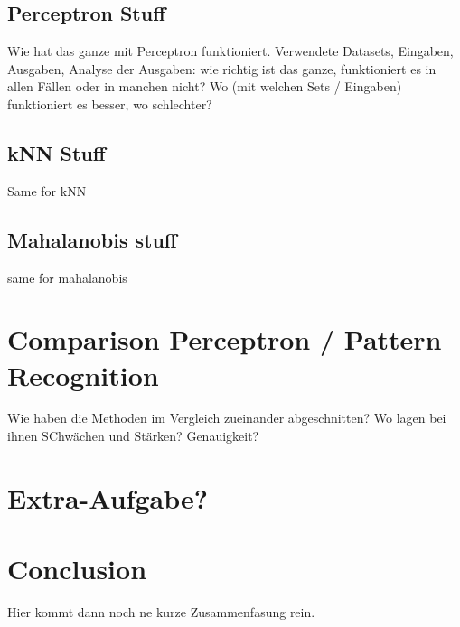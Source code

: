 \documentclass{article}
\begin{document}
\subsection{Perceptron Stuff}

Wie hat das ganze mit Perceptron funktioniert. Verwendete Datasets, Eingaben, Ausgaben, Analyse der Ausgaben: wie richtig ist das ganze, funktioniert es in allen Fällen oder in manchen nicht? Wo (mit welchen Sets / Eingaben) funktioniert es besser, wo schlechter?

\subsection{kNN Stuff}

Same for kNN

\subsection{Mahalanobis stuff}

same for mahalanobis

\section{Comparison Perceptron / Pattern Recognition}

Wie haben die Methoden im Vergleich zueinander abgeschnitten? Wo lagen bei ihnen SChwächen und Stärken? Genauigkeit? 


\section{Extra-Aufgabe?}

\section{Conclusion}

Hier kommt dann noch ne kurze Zusammenfasung rein.
\end{document}
